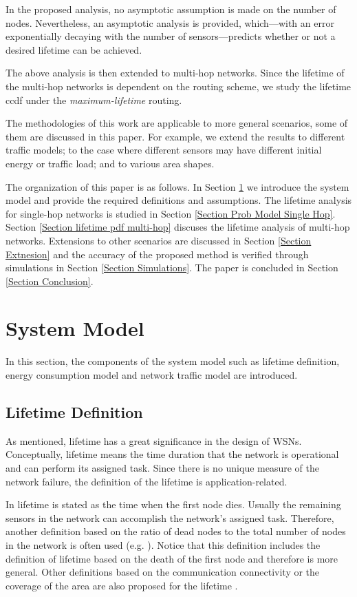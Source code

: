 \documentclass[conference]{IEEEtran}
\begin{document}
In the proposed analysis, no asymptotic assumption is made on the
number of nodes. Nevertheless, an asymptotic analysis is provided,
which---with an error exponentially decaying with the number of
sensors---predicts whether or not a desired lifetime can be
achieved.

The above analysis is then extended to multi-hop networks. Since the
lifetime of the multi-hop networks is dependent on the routing
scheme, we study the lifetime ccdf under the \emph{maximum-lifetime}
\cite{Al-Karaki_Routing_Magazine2004} routing.

The methodologies of this work are applicable to more general
scenarios, some of them are discussed in this paper. For example, we
extend the results to different traffic models; to the case where
different sensors may have different initial energy or traffic load;
and to various area shapes.

The organization of this paper is as follows. In Section
\ref{Section Model} we introduce the system model and provide the
required definitions and assumptions. The lifetime analysis for
single-hop networks is studied in Section \ref{Section Prob Model
Single Hop}. Section \ref{Section lifetime pdf multi-hop} discuses
the lifetime analysis of multi-hop networks. Extensions to other
scenarios are discussed in Section \ref{Section Extnesion} and the
accuracy of the proposed method is verified through simulations in
Section \ref{Section Simulations}. The paper is concluded in Section
\ref{Section Conclusion}.

\section{System Model}\label{Section Model}
In this section, the components of the system model such as lifetime
definition, energy consumption model and network traffic model are
introduced.

\subsection{Lifetime Definition}
As mentioned, lifetime has a great significance in the design of
WSNs. Conceptually, lifetime means the time duration that the
network is operational and can perform its assigned task. Since
there is no unique measure of the network failure, the definition of
the lifetime is application-related.

In \cite{Heinzelman_TCOM, Madan_Distributed_Routing_TWireless,
Chang_Energy_Conserving_Infocom} lifetime is stated as the time when
the first node dies. Usually the remaining sensors in the network
can accomplish the network's assigned task. Therefore, another
definition based on the ratio of dead nodes to the total number of
nodes in the network is often used (e.g.
\cite{DuarteMelo_Hetereogen_Globecom
,Heinemann_ACM_Mobicom2001,Oym_ICC_2004}). Notice that this
definition includes the definition of lifetime based on the death of
the first node and therefore is more general. Other definitions
based on the communication connectivity or the coverage of the area
are also proposed for the lifetime
\cite{Hou_Alpha_lifetime,Santi_Lifetime_cellbased}.
\end{document}
